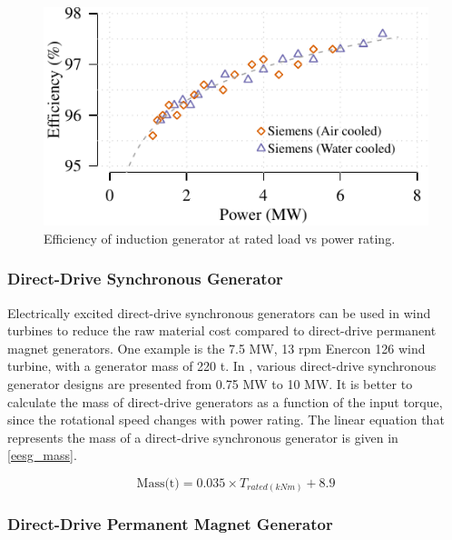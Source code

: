 \documentclass{article}\usepackage{graphicx, color}
\makeatletter
\def\maxwidth{ %
  \ifdim\Gin@nat@width>\linewidth
    \linewidth
  \else
    \Gin@nat@width
  \fi
}
\newenvironment{knitrout}{}{} %
\makeatother
\begin{document}
\begin{knitrout}
\color{fgcolor}\begin{figure}[]

\includegraphics[width=\maxwidth]{figure/induction_generator_efficiency} \caption[Efficiency of induction generator at rated load vs power rating]{Efficiency of induction generator at rated load vs power rating.\label{fig:induction_generator_efficiency}}
\end{figure}


\end{knitrout}



\subsubsection{Direct-Drive Synchronous Generator}

Electrically excited direct-drive synchronous generators can be used in wind turbines to reduce the raw material cost compared to direct-drive permanent magnet generators. One example is the 7.5 MW, 13 rpm Enercon 126 wind turbine, with a generator mass of 220 t.
In \cite{upwind2011}, various direct-drive synchronous generator designs are presented from 0.75 MW to 10 MW. It is better to calculate the mass of direct-drive generators as a function of the input torque, since the rotational speed changes with power rating. The linear equation that represents the mass of a direct-drive synchronous generator is given in \autoref{eesg_mass}.

\begin{equation}
  \text{Mass(t)} = 0.035 \times {T_{rated(kNm)}} + 8.9
  \label{eesg_mass}
\end{equation}

\subsubsection{Direct-Drive Permanent Magnet Generator}
\end{document}
